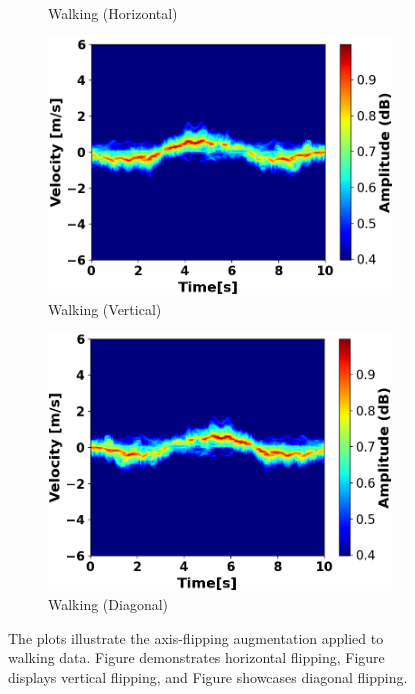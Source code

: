 \documentclass{l4proj}
\begin{document}
\begin{appendices}
\begin{figure}[h]
\begin{subfigure}[b]{0.35\textwidth}
        \caption{Walking (Horizontal)}
        \label{fig:velocity-Time_1_normalized_resized-horizontal-flip}
    \end{subfigure}
    \qquad
    \begin{subfigure}[b]{0.35\textwidth}
        \includegraphics[width=\textwidth]{images/Velocity-Time_1_normalized_resized-vertical-flip.png}
        \caption{Walking (Vertical)}
        \label{fig:velocity-Time_1_normalized_resized-vertical-flip}
    \end{subfigure}
    \qquad
    \begin{subfigure}[b]{0.35\textwidth}
        \includegraphics[width=\textwidth]{images/Velocity-Time_1_normalized_resized-diagonal-flip.png}
        \caption{Walking (Diagonal)}
        \label{fig:velocity-Time_1_normalized_resized-diagonal-flip}
    \end{subfigure}
  \caption{The plots illustrate the axis-flipping augmentation applied to walking data. Figure  demonstrates horizontal flipping, Figure  displays vertical flipping, and Figure  showcases diagonal flipping.}
  \label{fig:Axis-flipping Plots}
\end{figure}


\end{appendices}
\end{document}
